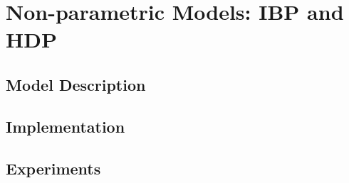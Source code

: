 \documentclass{article}
\begin{document}
\section{Non-parametric Models: IBP and HDP} 
\subsection{Model Description} 
\subsection{Implementation} 
\subsection{Experiments} 





\end{document}
